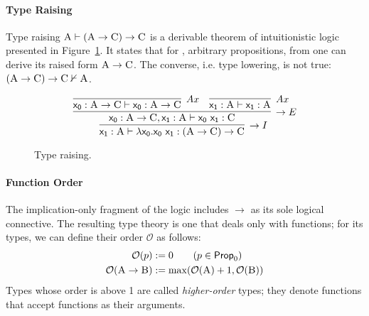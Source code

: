 \paragraph{Type Raising}
Type raising $\smallprop{A} \vdash (\smallprop{A} \to \smallprop{C}) \to \smallprop{C}$ is a derivable theorem of intuitionistic logic presented in Figure~\ref{figure:type_raising}. 
It states that for ,  arbitrary propositions, from  one can derive its raised form $\smallprop{A} \to \smallprop{C}$.
The converse, i.e. type lowering, is not true: $ (\smallprop{A} \to \smallprop{C}) \to \smallprop{C} \nvdash \smallprop{A}$.

\begin{figure}
	\[
		\infer[\to I]{\term{x_1}: \prop{A} \vdash \term{\lambda x_0.x_0~x_1}: (\prop{A} \to \prop{C}) \to \prop{C}}{
			\infer[\to E]{\term{x_0}: \prop{A} \to \prop{C}, \term{x_1}: \prop{A} \vdash \term{x_0~x_1}: \prop{C}}{
				\infer[Ax]{\term{x_0}: \prop{A} \to \prop{C} \vdash \term{x_0}: \prop{A} \to \prop{C}}{}
				&
				\infer[Ax]{\term{x_1}: \prop{A} \vdash \term{x_1}: \prop{A}}{}
			}
		}
	\]
	\caption{Type raising.}
	\label{figure:type_raising}
\end{figure}

\paragraph{Function Order} The implication-only fragment of the logic includes $\to$ as its sole logical connective.
The resulting type theory is one that deals only with functions; for its types, we can define their order $\mathcal{O}$ as follows:
\begin{align*}
\mathcal{O}(p) & := 0 \tag{$p \in \propcon{}$} \\
\mathcal{O}(\prop{A} \to \prop{B}) & := \mathrm{max}(\mathcal{O}(\prop{A}) + 1, \mathcal{O}(\prop{B}))\\
\end{align*}
Types whose order is above 1 are called \textit{higher-order} types; they denote functions that accept functions as their arguments.

